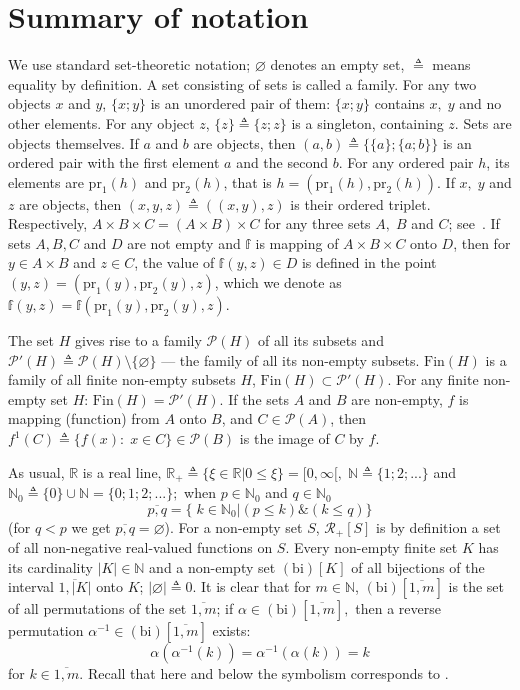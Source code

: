 \documentclass[numbers,sort&compress]{IntechOpen-Book}%
\begin{document}
\section{Summary of notation}
\label{sec:1}

We use standard set-theoretic notation;
$\varnothing$ denotes an empty set,
${\triangleq}$ means equality by definition.
A set consisting of sets
is called a family.
For any two objects $x$
and $y$,
$\{x;y\}$
is an unordered pair of them:
$\{x;y\}$ contains $x,\;y$
and no other elements.
For any object $z$,
$\{z\} {\triangleq} \{z;z\}$
is a singleton, containing
$z$.
Sets are objects themselves.
If $a$ and $b$ are objects, then
\cite[~67]{15}
$(a,b) {\triangleq} \{\{a\};\{a;b\}\}$
is an ordered pair with
the first element $a$
and the second $b$.
For any ordered pair $h$,
its elements are
$\mathrm{pr}_1(h)$
and
$\mathrm{pr}_2(h)$,
that is
$h = (\mathrm{pr} _1(h),\mathrm{pr} _2(h))$.
If $x,\;y$ and $z$ are objects,
then
$(x,y,z) {\triangleq} ((x,y),z)$
is their ordered triplet.
Respectively,
$A \times B \times C = (A \times B) \times C$
for any three sets
$A,\;B$ and $C$;
see~\cite[17]{16}.
If sets
$A, B, C$
and
$D$
are not empty and
$\mathbb{f}$
is mapping of
$A\times B\times C$ onto $D$,
then for
$y \in A\times B$
and
$z \in C$,
the value of
$\mathbb f(y,z)\in D$
is defined in the point
$(y,z) = (\mathrm{pr}_1(y), \mathrm{pr}_2(y), z)$,
which we denote as
$\mathbb f(y,z) = \mathbb f(\mathrm{pr}_1(y), \mathrm{pr}_2(y), z)$.

The set $H$
gives rise to a family $\mathcal{P}(H)$
of all its subsets
and $\mathcal{P}'(H) {\triangleq}
\mathcal{P}(H) \setminus \{\varnothing\}$
--- the family of all its non-empty subsets.
$\mathrm{Fin}(H)$
is a family of all finite
non-empty subsets
$H$,
$\mathrm{Fin}(H) \subset \mathcal{P}'(H)$.
For any finite non-empty set
$H$:
$\mathrm{Fin}(H) = \mathcal{P}'(H)$.
If the sets $A$ and $B$ are non-empty,
$f$ is mapping (function) from $A$ onto $B$,
and $C \in \mathcal{P}(A)$,
then
$f^1(C) {\triangleq} \{f(x):\;x \in C\} \in \mathcal{P}(B)$
is the image of $C$ by $f$.

As usual,
$\mathbb{R}$ is a real line,
$\mathbb{R}_+ {\triangleq} \{\xi \in \mathbb{R} \vert 0 \le \xi\} = [0,\infty[,\;\mathbb{N} {\triangleq} \{1;2;...\}$
and $\mathbb{N}_0 {\triangleq} \{0\} \cup \mathbb{N} = \{0;1;2;...\};$
when $p \in \mathbb{N}_0$
and $q \in \mathbb{N}_0$
$$
\overline{p,q} = \{\;k \in \mathbb{N}_0 \vert (p \le k) \& (k \le q)\}
$$
(for $q < p$ we get $\overline{p,q} = \varnothing$).
For a non-empty set
$S$,
$\mathcal{R}_+[S]$
is
by definition
a set of all non-negative real-valued functions on
$S$.
Every non-empty finite set $K$
has its cardinality
$|K| \in \mathbb{N}$
and a non-empty set $(\mathrm{bi})[K]$
of all bijections
\cite[87]{17}
of the interval
$\overline{1,|K|}$
onto $K$;
$|\varnothing| {\triangleq} 0$.
It is clear that for
$m \in \mathbb{N}$,
$(\mathrm{bi})[\overline{1,m}]$
is the set of all permutations
\cite[87]{17}
of the set
$\overline{1,m}$;
if
$\alpha \in (\mathrm{bi})[\overline{1,m}],$
then a reverse permutation
$\alpha^{-1} \in (\mathrm{bi})[\overline{1,m}]$
exists:
$$
    \alpha(\alpha^{-1}(k)) = \alpha^{-1}(\alpha(k)) = k
$$
for $k \in \overline{1,m}.$
Recall that here and below the symbolism corresponds to
\cite[$\S$3.1]{4}.
\end{document}
